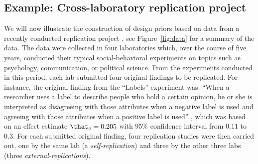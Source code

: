 \subsection{Example: Cross-laboratory replication project}
\label{sec:example}
We will now illustrate the construction of design priors based on data from a
recently conducted replication project \citep{Protzko2020}, see
Figure~\ref{fig:data} for a summary of the data. The data were collected in four
laboratories which, over the course of five years, conducted their typical
social-behavioral experiments on topics such as psychology, communication, or
political science. From the experiments conducted in this period, each lab
submitted four original findings to be replicated. For instance, the original
finding from the ``Labels'' experiment was: ``When a researcher uses a label to
describe people who hold a certain opinion, he or she is interpreted as
disagreeing with those attributes when a negative label is used and agreeing
with those attributes when a positive label is used'' \citep[p.
17]{Protzko2020}, which was based on an effect estimate
$\that_{o} = 0.205$ with 95\% confidence interval from
$0.11$ to $0.3$. For each submitted
original finding, four replication studies were then carried out, one by the
same lab (a \emph{self-replication}) and three by the other three labs (three
\emph{external-replications}).

